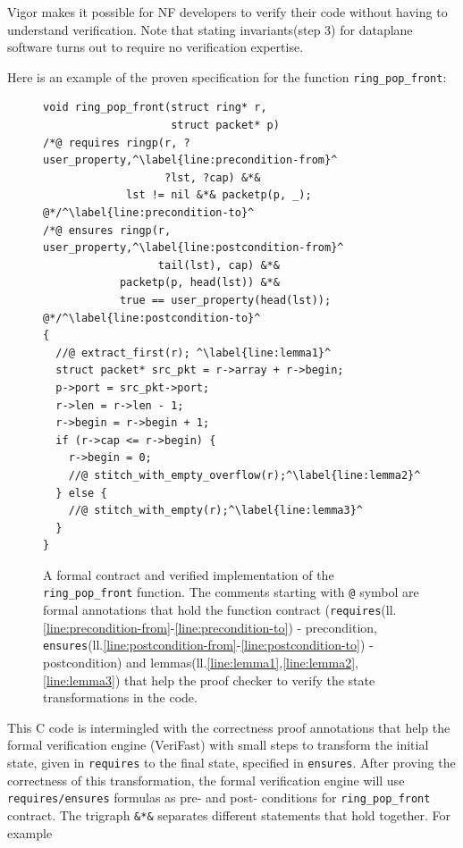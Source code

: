 \documentclass[letterpaper,twocolumn,10pt]{article}
\newcommand{\code}[1]{\lstinline{#1}}
\begin{document}
Vigor makes it possible for NF developers to verify their code without having to
understand verification. Note that stating invariants(step 3) for dataplane
software turns out to require no verification expertise.

Here is an example of the proven specification for the function
\code{ring_pop_front}:

\begin{figure}[h!]
\begin{lstlisting}
void ring_pop_front(struct ring* r,
                    struct packet* p)
/*@ requires ringp(r, ?user_property,^\label{line:precondition-from}^
                   ?lst, ?cap) &*&
             lst != nil &*& packetp(p, _); @*/^\label{line:precondition-to}^
/*@ ensures ringp(r, user_property,^\label{line:postcondition-from}^
                  tail(lst), cap) &*&
            packetp(p, head(lst)) &*&
            true == user_property(head(lst)); @*/^\label{line:postcondition-to}^
{
  //@ extract_first(r); ^\label{line:lemma1}^
  struct packet* src_pkt = r->array + r->begin;
  p->port = src_pkt->port;
  r->len = r->len - 1;
  r->begin = r->begin + 1;
  if (r->cap <= r->begin) {
    r->begin = 0;
    //@ stitch_with_empty_overflow(r);^\label{line:lemma2}^
  } else {
    //@ stitch_with_empty(r);^\label{line:lemma3}^
  }
}
\end{lstlisting}
  \caption{A formal contract and verified implementation of the
    \code{ring_pop_front} function. The comments starting with \code{@} symbol
    are formal annotations that hold the function contract
    (\code{requires}(ll.\ref{line:precondition-from}-\ref{line:precondition-to})
    - precondition,
    \code{ensures}(ll.\ref{line:postcondition-from}-\ref{line:postcondition-to})
    - postcondition) and
    lemmas(ll.\ref{line:lemma1},\ref{line:lemma2},\ref{line:lemma3}) that help
    the proof checker to verify the state transformations in the code.}
  \label{lst:contract}
\end{figure}

This C code is intermingled with the correctness proof annotations that help the
formal verification engine (VeriFast) with small steps to transform the initial
state, given in \code{requires} to the final state, specified in \code{ensures}.
After proving the correctness of this transformation, the formal verification
engine will use \code{requires/ensures} formulas as pre- and post- conditions
for \code{ring_pop_front} contract. The trigraph \code{&*&} separates different
statements that hold together. For example
\end{document}

